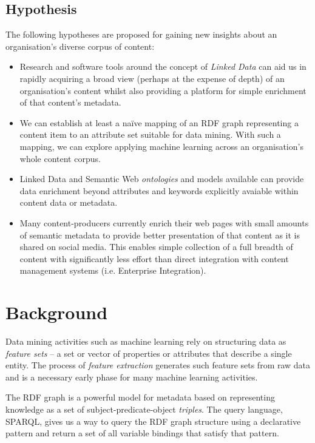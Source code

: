 \documentclass{sig-alternate-05-2015}
\begin{document}
\subsection{Hypothesis}

The following hypotheses are proposed for gaining new insights about an
organisation's diverse corpus of content:

\begin{itemize}

\item Research and software tools around the concept of \emph{Linked Data} can
aid us in rapidly acquiring a broad view (perhaps at the expense of depth) of an
organisation's content whilst also providing a platform for simple enrichment of
that content's metadata.

\item We can establish at least a na\"ive mapping of an RDF graph representing a
content item to an attribute set suitable for data mining. With such a mapping,
we can explore applying machine learning across an organisation's whole content
corpus.

\item Linked Data and Semantic Web \emph{ontologies} and models available can
provide data enrichment beyond attributes and keywords explicitly avaiable
within content data or metadata.

\item Many content-producers currently enrich their web pages with small
amounts of semantic metadata to provide better presentation of that content
as it is shared on social media. This enables simple collection of a full
breadth of content with significantly less effort than direct integration
with content management systems (i.e. Enterprise Integration).

\end{itemize}

\section{Background}

Data mining activities such as machine learning rely on structuring data as
\emph{feature sets}\cite{bishop2006pattern} -- a set or vector of properties or
attributes that describe a single entity.
The process of \emph{feature extraction}
generates such feature sets from raw data and is a necessary early phase for
many machine learning activities.

The RDF graph is a powerful model
for metadata based on representing knowledge as a set of
subject-predicate-object \emph{triples}. The query language, SPARQL, gives us a
way to query the RDF graph structure using a declarative pattern and return a
set of all variable bindings that satisfy that pattern.
\end{document}
